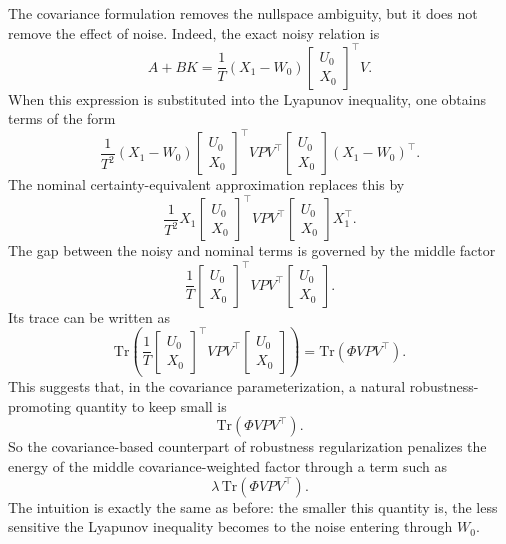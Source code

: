 The covariance formulation removes the nullspace ambiguity, but it does not remove the effect
of noise. Indeed, the exact noisy relation is
\[
A+BK=
\frac{1}{T}(X_1-W_0)
\begin{bmatrix}
U_0\\[0.3em]
X_0
\end{bmatrix}^\top V.
\]
When this expression is substituted into the Lyapunov inequality, one obtains terms of the form
\[
\frac{1}{T^2}
(X_1-W_0)
\begin{bmatrix}
U_0\\[0.3em]
X_0
\end{bmatrix}^\top
VPV^\top
\begin{bmatrix}
U_0\\[0.3em]
X_0
\end{bmatrix}
(X_1-W_0)^\top.
\]
The nominal certainty-equivalent approximation replaces this by
\[
\frac{1}{T^2}
X_1
\begin{bmatrix}
U_0\\[0.3em]
X_0
\end{bmatrix}^\top
VPV^\top
\begin{bmatrix}
U_0\\[0.3em]
X_0
\end{bmatrix}
X_1^\top.
\]
The gap between the noisy and nominal terms is governed by the middle factor
\[
\frac{1}{T}
\begin{bmatrix}
U_0\\[0.3em]
X_0
\end{bmatrix}^\top
VPV^\top
\begin{bmatrix}
U_0\\[0.3em]
X_0
\end{bmatrix}.
\]
Its trace can be written as
\[
\text{Tr}\!\left(
\frac{1}{T}
\begin{bmatrix}
U_0\\[0.3em]
X_0
\end{bmatrix}^\top
VPV^\top
\begin{bmatrix}
U_0\\[0.3em]
X_0
\end{bmatrix}
\right)
=
\text{Tr}(\Phi V P V^\top).
\]
This suggests that, in the covariance parameterization, a natural robustness-promoting quantity
to keep small is
\[
\text{Tr}(\Phi V P V^\top).
\]
So the covariance-based counterpart of robustness regularization penalizes the energy of the
middle covariance-weighted factor through a term such as
\[
\lambda\,\text{Tr}(\Phi V P V^\top).
\]
The intuition is exactly the same as before: the smaller this quantity is, the less sensitive the
Lyapunov inequality becomes to the noise entering through $W_0$.\\

